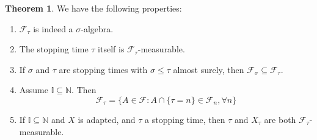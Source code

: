 \documentclass[11pt,a4paper]{article}
\theoremstyle{definition}
\newtheorem{theorem}{Theorem}[section]
\begin{document}
\begin{theorem}
    We have the following properties:
    \begin{enumerate}
    \item $\mathcal{F}_\tau$ is indeed a $\sigma$-algebra.
    
    \item The stopping time $\tau$ itself is $\mathcal{F}_\tau$-measurable.
    
    \item If $\sigma$ and $\tau$ are stopping times with $\sigma \leq \tau$ almost surely, then $\mathcal{F}_\sigma \subseteq \mathcal{F}_\tau$.
    
    
    \item Assume $\mathbb{I} \subseteq \mathbb{N}$. Then \[
    \mathcal{F}_\tau =  \{A \in \mathcal{F} : A \cap \{\tau = n\} \in \mathcal{F}_n, \forall n\}
    \]
    \item If $\mathbb{I} \subseteq \mathbb{N}$ and $X$ is adapted, and $\tau$ a stopping time, then $\tau$ and $X_\tau$ are both $\mathcal{F}_\tau$-measurable.
\end{enumerate}
\end{theorem}
\end{document}
